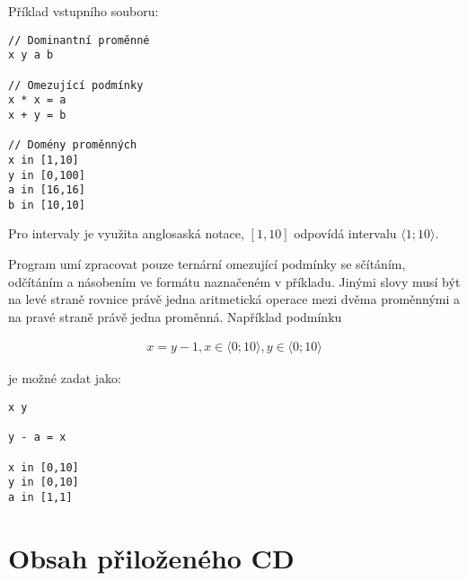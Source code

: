 \documentclass[thesis=B,czech]{FITthesis}[2012/06/26]
\theoremstyle{definition}
\begin{document}
Příklad vstupního souboru:

\begin{Verbatim}[samepage=true]
// Dominantní proměnné
x y a b

// Omezující podmínky
x * x = a
x + y = b

// Domény proměnných
x in [1,10]
y in [0,100]
a in [16,16]
b in [10,10]
\end{Verbatim}


Pro intervaly je využita anglosaská notace, $[1,10]$ odpovídá intervalu $\langle 1;10 \rangle$.

Program umí zpracovat pouze ternární omezující podmínky se sčítáním, odčítáním a násobením ve formátu naznačeném v příkladu. Jinými slovy musí být na levé straně rovnice právě jedna aritmetická operace mezi dvěma proměnnými a na pravé straně právě jedna proměnná. Například podmínku

\begin{align*}
x = y - 1, x \in \langle 0;10\rangle, y \in \langle 0;10\rangle
\end{align*}

je možné zadat jako:

\begin{Verbatim}[samepage=true]
x y

y - a = x

x in [0,10]
y in [0,10]
a in [1,1]
\end{Verbatim}


\chapter{Obsah přiloženého CD}

\begin{figure}
\end{figure}
\end{document}
